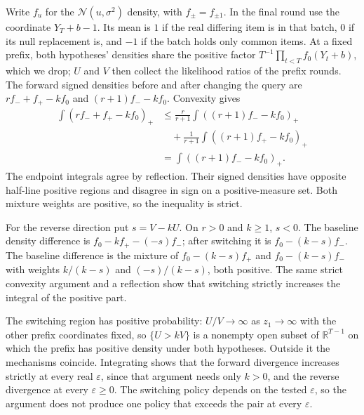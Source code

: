 \documentclass[conference]{IEEEtran}
\newcommand{\R}{\mathbb R}
\newcommand{\N}{\mathcal N}
\newcommand{\eps}{\varepsilon}
\begin{document}
Write $f_u$ for the $\N(u,\sigma^2)$ density, with $f_\pm=f_{\pm1}$. In the final round use the coordinate $Y_T+b-1$. Its mean is $1$ if the real differing item is in that batch, $0$ if its null replacement is, and $-1$ if the batch holds only common items. At a fixed prefix, both hypotheses' densities share the positive factor $T^{-1}\prod_{t<T}f_0(Y_t+b)$, which we drop; $U$ and $V$ then collect the likelihood ratios of the prefix rounds. The forward signed densities before and after changing the query are $rf_-+f_+-kf_0$ and $(r+1)f_--kf_0$. Convexity gives
\begin{align*}
 \int(rf_-+f_+-kf_0)_+
 &\le\frac r{r+1}\int((r+1)f_--kf_0)_+\\
 &\quad+\frac1{r+1}\int((r+1)f_+-kf_0)_+\\
 &=\int((r+1)f_--kf_0)_+.
\end{align*}
The endpoint integrals agree by reflection. Their signed densities have opposite half-line positive regions and disagree in sign on a positive-measure set. Both mixture weights are positive, so the inequality is strict.

For the reverse direction put $s=V-kU$. On $r>0$ and $k\ge1$, $s<0$. The baseline density difference is $f_0-kf_+-(-s)f_-$; after switching it is $f_0-(k-s)f_-$. The baseline difference is the mixture of $f_0-(k-s)f_+$ and $f_0-(k-s)f_-$ with weights $k/(k-s)$ and $(-s)/(k-s)$, both positive. The same strict convexity argument and a reflection show that switching strictly increases the integral of the positive part.

The switching region has positive probability: $U/V\to\infty$ as $z_1\to\infty$ with the other prefix coordinates fixed, so $\{U>kV\}$ is a nonempty open subset of $\R^{T-1}$ on which the prefix has positive density under both hypotheses. Outside it the mechanisms coincide. Integrating shows that the forward divergence increases strictly at every real $\eps$, since that argument needs only $k>0$, and the reverse divergence at every $\eps\ge0$. The switching policy depends on the tested $\eps$, so the argument does not produce one policy that exceeds the pair at every $\eps$.
\end{document}
